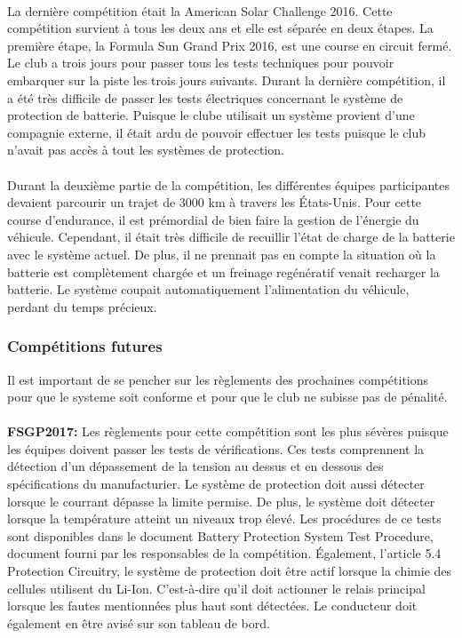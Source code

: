		\paragraph{}
		La dernière compétition était la American Solar Challenge 2016. Cette compétition survient à tous les deux ans et elle est séparée en deux étapes. La première étape, la Formula Sun Grand Prix 2016, est une course en circuit fermé. Le club a trois jours pour passer tous les tests techniques pour pouvoir embarquer sur la piste les trois jours suivants. Durant la dernière compétition, il a été très difficile de passer les tests électriques concernant le système de protection de batterie. Puisque le clube utilisait un système provient d'une compagnie externe, il était ardu de pouvoir effectuer les tests puisque le club n'avait pas accès à tout les systèmes de protection.
		
		\paragraph{}
		Durant la deuxième partie de la compétition, les différentes équipes participantes devaient parcourir un trajet de 3000 km à travers les États-Unis. Pour cette course d'endurance, il est prémordial de bien faire la gestion de l'énergie du véhicule. Cependant, il était très difficile de recuillir l'état de charge de la batterie avec le système actuel. De plus, il ne prennait pas en compte la situation où la batterie est complètement chargée et un freinage regénératif venait recharger la batterie. Le système coupait automatiquement l'alimentation du véhicule, perdant du temps précieux.
	
	\subsubsection{Compétitions futures}
	Il est important de se pencher sur les règlements des prochaines compétitions pour que le systeme soit conforme et pour que le club ne subisse pas de pénalité.
	
		\paragraph{}
		\textbf{FSGP2017:} Les règlements pour cette compétition sont les plus sévères puisque les équipes doivent passer les tests de vérifications. Ces tests comprennent la détection d'un dépassement de la tension au dessus et en dessous des spécifications du manufacturier. Le système de protection doit aussi détecter lorsque le courrant dépasse la limite permise. De plus, le système doit détecter lorsque la température atteint un niveaux trop élevé. Les procédures de ce tests sont disponibles dans le document Battery Protection System Test Procedure, document fourni par les responsables de la compétition. Également, l'article 5.4 Protection Circuitry, le système de protection doit être actif lorsque la chimie des cellules utilisent du Li-Ion. C'est-à-dire qu'il doit actionner le relais principal lorsque les fautes mentionnées plus haut sont détectées. Le conducteur doit également en être avisé sur son tableau de bord.
		
